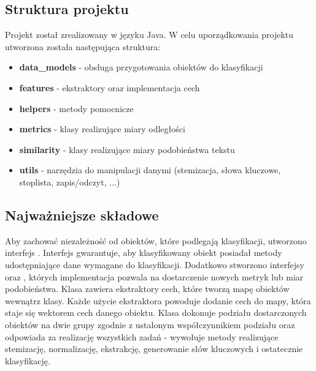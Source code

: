 \documentclass{classrep}
\begin{document}
\subsection{Struktura projektu}
Projekt został zrealizowany w języku Java. W celu uporządkowania projektu utworzona została następująca struktura:
\begin{itemize}
    \item \textbf{data\_models} - obsługa przygotowania obiektów do klasyfikacji
    \item \textbf{features} - ekstraktory oraz implementacja cech
    \item \textbf{helpers} - metody pomocnicze
    \item \textbf{metrics} - klasy realizujące miary odległości
    \item \textbf{similarity} - klasy realizujące miary podobieństwa tekstu
    \item \textbf{utils} - narzędzia do manipulacji danymi (stemizacja, słowa kluczowe, stoplista, zapis/odczyt, ...)
\end{itemize}

\subsection{Najważniejsze składowe}
Aby zachować niezależność od obiektów, które podlegają klasyfikacji, utworzono interfejs .
Interfejs gwarantuje, aby klasyfikowany obiekt posiadał metody udostępniające dane wymagane do klasyfikacji. Dodatkowo 
stworzono interfejsy  oraz , których implementacja pozwala na dostarczenie
nowych metryk lub miar podobieństwa. Klasa  zawiera ekstraktory cech, które tworzą mapę obiektów 
 wewnątrz klasy. Każde użycie ekstraktora powoduje dodanie cech do mapy, która staje się wektorem 
cech danego obiektu. Klasa  dokonuje podziału dostarczonych obiektów na dwie grupy zgodnie
z ustalonym współczynnikiem podziału oraz odpowiada za realizację wszystkich zadań - wywołuje metody realizujące
stemizację, normalizację, ekstrakcję, generowanie słów kluczowych i ostatecznie klasyfikację.
\end{document}
